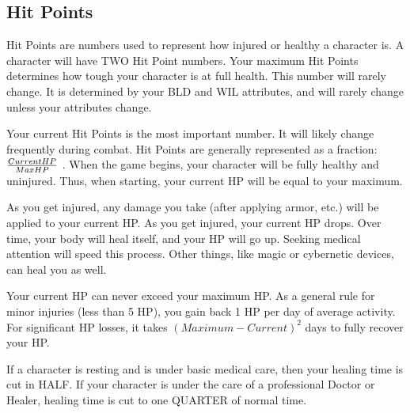 \documentclass[twoside]{book}
\begin{document}
    

\subsection{Hit Points}
    
    {  
    Hit Points are numbers used to represent how injured
               or healthy a character is. A character will have TWO Hit
               Point numbers. Your maximum Hit Points determines how
               tough your character is at full health. This number will
               rarely change. It is determined by your BLD and WIL
               attributes, and will rarely change unless your attributes
               change. 
    }
  
    {  
    Your current Hit Points is the most important number.
              It will likely change frequently during combat. Hit Points
              are generally represented as a fraction: \begin{math}{{
              Current HP}\over{Max HP}}\end{math} . When the
              game begins, your character will be fully healthy and
              uninjured. Thus, when starting, your current HP will be
              equal to your maximum.
            
    }
  
    {  
    As you get injured, any damage you take (after
               applying armor, etc.) will be applied to your current HP.
               As you get injured, your current HP drops. Over time, your
               body will heal itself, and your HP will go up. Seeking
               medical attention will speed this process. Other things,
               like magic or cybernetic devices, can heal you as well.
               
    }
  
    {  
    Your current HP can never exceed your maximum HP. As
               a general rule for minor injuries (less than 5 HP), you
               gain back 1 HP per day of average activity. For
               significant HP losses, it takes \begin{math}  
                    {   (   Maximum 
                      -   Current   )  
                     }^{ 2 }    \end{math}  days to fully recover your HP.
            
    }
  
    {  
    If a character is resting and is under basic medical
               care, then your healing time is cut in HALF. If your
               character is under the care of a professional Doctor or
               Healer, healing time is cut to one QUARTER of normal time.
               
    }
  
\end{document}
